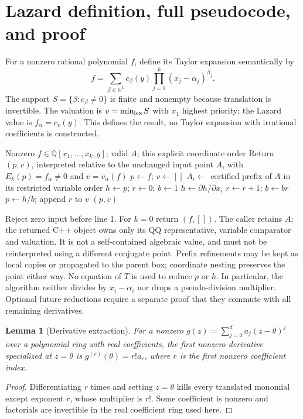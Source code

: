 \documentclass[11pt]{article}
\newtheorem{lemma}[theorem]{Lemma}
\theoremstyle{definition}
\newcommand{\QQ}{\mathbb Q}
\newcommand{\alg}[1]{\textsc{#1}}
\begin{document}
\section{Lazard definition, full pseudocode, and proof}
For a nonzero rational polynomial $f$, define its Taylor expansion semantically by
\[
 f=\sum_{\beta\in\mathbb N^k}c_\beta(y)
       \prod_{j=1}^k(x_j-\alpha_j)^{\beta_j}.
\]
The support $S=\{\beta:c_\beta\ne0\}$ is finite and nonempty because translation
is invertible. The valuation is $v=\min_{\rm lex}S$ with $x_1$ highest priority;
the Lazard value is $f_\alpha=c_v(y)$. This defines the result; no Taylor expansion
with irrational coefficients is constructed.

\begin{algorithm}[H]
\caption{LAZARD-QQ: frozen rational representatives}\label{a:lazard}
\begin{algorithmic}[1]
\Require Nonzero $f\in\QQ[x_1,\ldots,x_k,y]$; valid $A$; this explicit coordinate order
\Ensure Return $(p,v)$, interpreted relative to the unchanged input point $A$, with
$E_k(p)=f_\alpha\ne0$ and $v=v_\alpha(f)$
\State $p\gets f$; $v\gets[]$
 \State $A_i\gets$ certified prefix of $A$ in its restricted variable order
 \State $h\gets p$; $r\gets0$; $b\gets1$
 \While{$\alg{PREFIX-ZERO}(h,A_i,(x_{i+1},\ldots,x_k,y))$}
  \State $h\gets\partial h/\partial x_i$ 
  \State $r\gets r+1$; $b\gets b r$
 \EndWhile
 \State $p\gets h/b$; append $r$ to $v$ 
\EndFor
\State \Return $(p,v)$
\end{algorithmic}
\end{algorithm}
Reject zero input before line 1. For $k=0$ return $(f,[])$.
The caller retains $A$; the returned C++ object owns only its QQ representative,
variable comparator and valuation. It is not a self-contained algebraic value,
and must not be reinterpreted using a different conjugate point.
Prefix refinements may be kept as local copies or propagated to the parent box;
coordinate nesting preserves the point either way. No equation of $T$ is used to
reduce $p$ or $h$. In particular, the algorithm neither divides by
$x_i-\alpha_i$ nor drops a pseudo-division multiplier. Optional future reductions
require a separate proof that they commute with all remaining derivatives.

\begin{lemma}[Derivative extraction]
For a nonzero $g(z)=\sum_{j=0}^d a_j(z-\theta)^j$ over a polynomial ring with real
coefficients, the first nonzero derivative specialized at $z=\theta$ is
$g^{(r)}(\theta)=r!a_r$, where $r$ is the first nonzero coefficient index.
\end{lemma}
\begin{proof}
Differentiating $r$ times and setting $z=\theta$ kills every translated monomial
except exponent $r$, whose multiplier is $r!$. Some coefficient is nonzero and
factorials are invertible in the real coefficient ring used here.
\end{proof}
\end{document}

